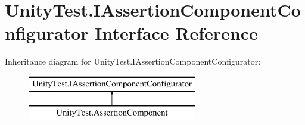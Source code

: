 \hypertarget{interface_unity_test_1_1_i_assertion_component_configurator}{}\section{Unity\+Test.\+I\+Assertion\+Component\+Configurator Interface Reference}
\label{interface_unity_test_1_1_i_assertion_component_configurator}
Inheritance diagram for Unity\+Test.\+I\+Assertion\+Component\+Configurator\+:\begin{figure}[H]
\begin{center}
\leavevmode
\includegraphics[height=2.000000cm]{interface_unity_test_1_1_i_assertion_component_configurator}
\end{center}
\end{figure}
